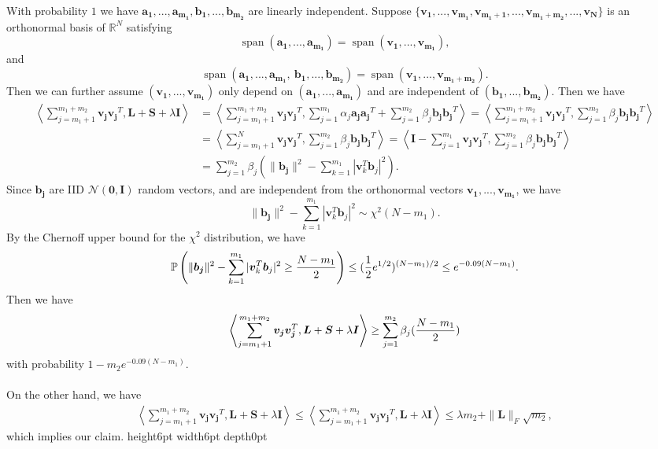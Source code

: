 \documentclass[11pt]{article}
\newcommand{\<}{\langle}
\renewcommand{\>}{\rangle}
\renewcommand{\P}{\operatorname{\mathbb{P}}}
\newcommand{\vct}[1]{\bm{#1}}
\newcommand{\mtx}[1]{\bm{#1}}
\newcommand{\Span}{\operatorname{span}}
\numberwithin{equation}{section}
\def \endprf{\hfill {\vrule height6pt width6pt depth0pt}\medskip}
\newenvironment{proof}{\noindent {\bf Proof} }{\endprf\par}
\begin{document}
\begin{proof}
With probability $1$ we have $\vct{a_1}, ..., \vct{a_{m_1}}, \vct{b_1}, ..., \vct{b_{m_2}}$ are linearly independent. Suppose 
$\{\vct{v_1}, ..., \vct{v_{m_1}}, \vct{v_{m_1+1}}, ..., \vct{v_{m_1+m_2}}, ..., \vct{v_N}\}$ is an orthonormal basis of 
$\mathbb{R}^N$ satisfying
\[
\Span{(\vct{a_1}, ..., \vct{a_{m_1}})}=\Span{(\vct{v_1}, ..., \vct{v_{m_1}})},
\]
and
\[
\Span{(\vct{a_1}, ..., \vct{a_{m_1}},~\vct{b_1}, ..., \vct{b_{m_2}})}=\Span(\vct{v_1}, ..., \vct{v_{m_1+m_2}}).
\]
Then we can further assume $(\vct{v_1}, ..., \vct{v_{m_1}})$ only depend on $(\vct{a_1}, ..., \vct{a_{m_1}})$ and 
are independent of $(\vct{b_1}, ..., \vct{b_{m_2}})$.
Then we have
\begin{align*}
\left\langle\sum_{j=m_1+1}^{m_1+m_2} \vct{v_j}\vct{v_j}^T, \mtx{L}+\mtx{S}+\lambda\mtx{I}\right\rangle
&=\left\langle\sum_{j=m_1+1}^{m_1+m_2} \vct{v_j}\vct{v_j}^T, \sum_{j=1}^{m_1}\alpha_j\vct{a_j}\vct{a_j}^T+\sum_{j=1}^
{m_2}\beta_j\vct{b_j}\vct{b_j}^T\right\rangle=\left\langle\sum_{j=m_1+1}^{m_1+m_2} \vct{v_j}\vct{v_j}^T, \sum_{j=1}^
{m_2}\beta_j\vct{b_j}\vct{b_j}^T\right\rangle\\
&=\left\langle\sum_{j=m_1+1}^N \vct{v_j}\vct{v_j}^T, \sum_{j=1}^{m_2}\beta_j\vct{b_j}\vct{b_j}^T\right\rangle=\left\langle\mtx{I}-\sum_
{j=1}^{m_1} \vct{v_j}\vct{v_j}^T, \sum_{j=1}^{m_2}\beta_j\vct{b_j}\vct{b_j}^T\right\rangle\\
&=\sum_{j=1}^{m_2}\beta_j\left(\|\vct{b_j}\|^2-\sum_{k=1}^{m_1}|\vct{v}_k^T\vct{b}_j|^2\right).
\end{align*}
Since $\vct{b_j}$ are IID $\mathcal{N}(\vct{0}, \mtx{I})$ random vectors, and are independent from the orthonormal vectors $\vct{v_1}, ..., \vct{v_{m_1}}$, we have
\[
\|\vct{b_j}\|^2-\sum_{k=1}^{m_1}|\vct{v}_k^T\vct{b}_j|^2 \sim \chi^2(N-m_1).
\]
By the Chernoff upper bound for the $\chi^2$ distribution, we have
\[
\P\left(\|\vct{b_j}\|^2-\sum_{k=1}^{m_1}|\vct{v}_k^T\vct{b}_j|^2 \geq {{N-m_1}\over 2}\right)\leq ({1\over 2}e^{1/2})^{(N-m_1)/2}\leq e^{-0.09(N-m_1)}.
\]
Then we have
\[
\left\langle\sum_{j=m_1+1}^{m_1+m_2} \vct{v_j}\vct{v_j}^T, \mtx{L}+\mtx{S}+\lambda\mtx{I}\right\rangle\geq \sum_{j=1}^{m_2} \beta_j({{N-m_1}\over 2})
\]
with probability $1-m_2e^{-0.09(N-m_1)}$.\\
\\
On the other hand, we have
\begin{align*}
\left\langle\sum_{j=m_1+1}^{m_1+m_2} \vct{v_j}\vct{v_j}^T, \mtx{L}+\mtx{S}+\lambda\mtx{I}\right\rangle  \leq \left\langle\sum_
{j=m_1+1}^{m_1+m_2} \vct{v_j}\vct{v_j}^T, \mtx{L}+\lambda\mtx{I}\right\rangle  \leq \lambda m_2+\|\mtx{L}\|_F \sqrt{m_2},
\end{align*}
which implies our claim.
\end{proof}
\end{document}
